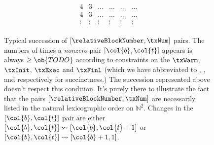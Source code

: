 \begin{figure}
\[\begin{array}{|c|c||c|c|c|c|}
	4 & 3 & \dots & \dots & \dots & \dots \\
	4 & 3 & \dots & \dots & \dots & \dots \\
	\vdots & \vdots & \vdots & \vdots & \vdots & \vdots \\
\end{array}
\]
\caption{Typical succession of $[ \relativeBlockNumber, \txNum ]$ pairs. The numbers of times a \emph{nonzero} pair $[\col{b}, \col{t}]$ appears is always $\geq \ob{TODO}$ according to constraints on the
$\txWarm$,
$\txInit$,
$\txExec$ and
$\txFinl$ (which we have abbreviated to
,
,
 and
 respectively for succinctness.) The succession represented above doesn't respect this condition. It's purely there to illustrate the fact that the pairs $[ \relativeBlockNumber, \txNum ]$ are necessarily listed in the natural lexicographic order on $\mathbb{N}^2$. Changes in the $[ \col{b}, \col{t} ]$ pair are either
$[ \col{b}, \col{t} ]\rightsquigarrow [ \col{b}, \col{t} + 1]$ or
$[ \col{b}, \col{t} ]\rightsquigarrow [ \col{b} + 1, 1]$. }
\end{figure}
